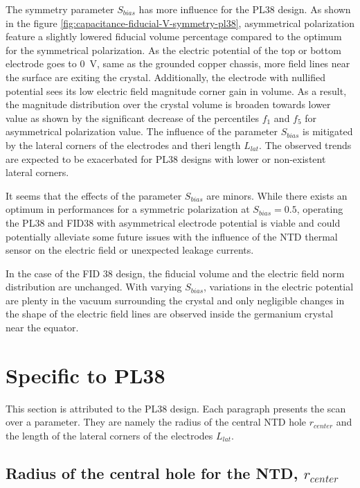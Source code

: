 The symmetry parameter $S_{bias}$ has more influence for the PL38 design. As shown in the figure \ref{fig:capacitance-fiducial-V-symmetry-pl38}, asymmetrical polarization feature a slightly lowered fiducial volume percentage compared to the optimum for the symmetrical polarization. As the electric potential of the top or bottom electrode goes to \SI{0}{\volt}, same as the grounded copper chassis, more field lines near the surface are exiting the crystal. Additionally, the electrode with nullified potential sees its low electric field magnitude corner gain in volume. As a result, the magnitude distribution over the crystal volume is broaden towards lower value as shown by the significant decrease of the percentiles $f_1$ and $f_5$ for asymmetrical polarization value.
The influence of the parameter $S_{bias}$ is mitigated by the lateral corners of the electrodes and theri length $L_{lat}$. The observed trends are expected to be exacerbated for PL38 designs with lower or non-existent lateral corners.

It seems that the effects of the parameter $S_{bias}$ are minors. While there exists an optimum in performances for a symmetric polarization at $S_{bias}=\num{0.5}$, operating the PL38 and FID38 with asymmetrical electrode potential is viable and could potentially alleviate some future issues with the influence of the NTD thermal sensor on the electric field or unexpected leakage currents.

In the case of the FID 38 design, the fiducial volume and the electric field norm distribution are unchanged. With varying $S_{bias}$, variations in the electric potential are plenty in the vacuum surrounding the crystal and only negligible changes in the shape of the electric field lines are observed inside the germanium crystal near the equator.


\section{Specific to PL38}

This section is attributed to the PL38 design. Each paragraph presents the scan over a parameter. They are namely the radius of the central NTD hole $r_{center}$ and the length of the lateral corners of the electrodes $L_{lat}$.


\subsection{Radius of the central hole for the NTD, $r_{center}$}


